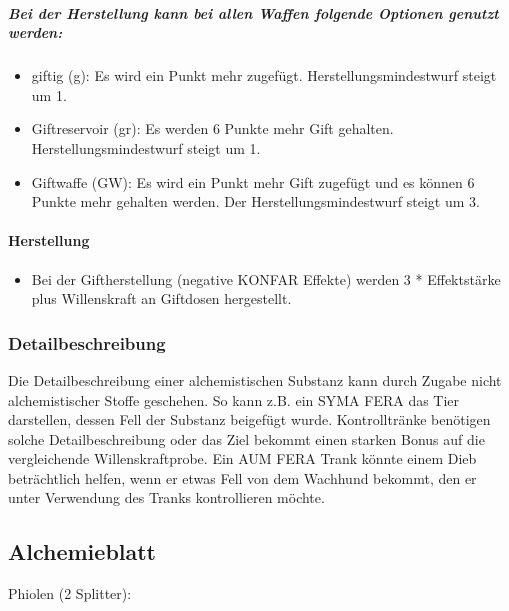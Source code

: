 \documentclass{article}
\begin{document}
\subparagraph{Bei der Herstellung kann bei allen Waffen folgende Optionen genutzt werden:}

\begin{itemize}
\item giftig (g): Es wird ein Punkt mehr zugefügt. Herstellungsmindestwurf steigt um 1.
\item Giftreservoir (gr): Es werden 6 Punkte mehr Gift gehalten. Herstellungsmindestwurf steigt um 1.
\item Giftwaffe (GW): Es wird ein Punkt mehr Gift zugefügt und es können 6 Punkte mehr gehalten werden. Der Herstellungsmindestwurf steigt um 3.
\end{itemize}

\paragraph{Herstellung}

\begin{itemize}
\item Bei der Giftherstellung (negative KONFAR Effekte) werden 3 * Effektstärke plus Willenskraft an Giftdosen hergestellt.
\end{itemize}

\subsubsection{Detailbeschreibung}

Die Detailbeschreibung einer alchemistischen Substanz kann durch Zugabe nicht alchemistischer Stoffe
geschehen. So kann z.B. ein SYMA FERA das Tier darstellen, dessen Fell der Substanz beigefügt wurde.
Kontrolltränke benötigen solche Detailbeschreibung oder das Ziel bekommt einen starken Bonus auf die vergleichende
Willenskraftprobe. Ein AUM FERA Trank könnte einem Dieb beträchtlich helfen, wenn er
etwas Fell von dem Wachhund bekommt, den er unter Verwendung des Tranks kontrollieren möchte.

\newpage

\begin{center}
\subsection{Alchemieblatt}
\end{center}
Phiolen (2 Splitter):
\end{document}
